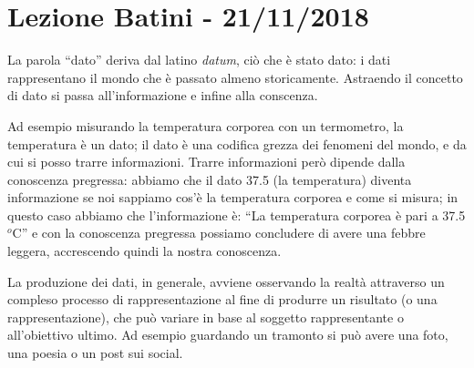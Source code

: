\documentclass[a4page, 11pt]{article}
\begin{document}
\section*{Lezione Batini - 21/11/2018}
La parola ``dato'' deriva dal latino \textit{datum}, ciò che è stato dato: i dati rappresentano il mondo che è passato almeno storicamente.
Astraendo il concetto di dato si passa all'informazione e infine alla conscenza.

Ad esempio misurando la temperatura corporea con un termometro, la temperatura è un dato; il dato è una codifica grezza dei fenomeni del mondo, e da cui si posso trarre informazioni.
Trarre informazioni però dipende dalla conoscenza pregressa: abbiamo che il dato 37.5 (la temperatura) diventa informazione se noi sappiamo cos'è la temperatura corporea e come si misura; in questo caso abbiamo che l'informazione è: ``La temperatura corporea è pari a 37.5 $^o$C'' e con la conoscenza pregressa possiamo concludere di avere una febbre leggera, accrescendo quindi la nostra conoscenza.

La produzione dei dati, in generale, avviene osservando la realtà attraverso un compleso processo di rappresentazione al fine di produrre un risultato (o una rappresentazione), che può variare in base al soggetto rappresentante o all'obiettivo ultimo.
Ad esempio guardando un tramonto si può avere una foto, una poesia o un post sui social.
\end{document}
